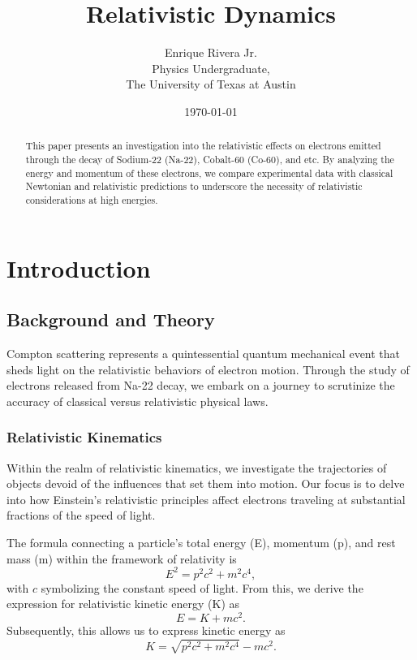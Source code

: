 \documentclass[12pt]{article}
\title{Relativistic Dynamics}
\author{Enrique Rivera Jr. \\
        Physics Undergraduate, \\ 
        The University of Texas at Austin}
\date{\today}
\begin{document}
\maketitle

\begin{abstract}
        This paper presents an investigation into the relativistic effects on electrons emitted through 
        the decay of Sodium-22 (Na-22), Cobalt-60 (Co-60), and etc. By analyzing the energy and momentum of these electrons, 
        we compare experimental data with classical Newtonian and relativistic predictions to underscore 
        the necessity of relativistic considerations at high energies.
\end{abstract}

\section{Introduction}
    \subsection{Background and Theory}
            Compton scattering represents a quintessential quantum mechanical event that sheds light on the relativistic behaviors of electron motion. Through the study of electrons released from Na-22 decay, we embark on a journey to scrutinize the accuracy of classical versus relativistic physical laws.
            
            \subsubsection{Relativistic Kinematics}
                    Within the realm of relativistic kinematics, we investigate the trajectories of objects devoid of the influences that set them into motion. Our focus is to delve into how Einstein's relativistic principles affect electrons traveling at substantial fractions of the speed of light.
                    
                    The formula connecting a particle's total energy (E), momentum (p), and rest mass (m) within the framework of relativity is
                    \begin{equation}
                    E^2 = p^2c^2 + m^2c^4,
                    \end{equation}
                    with \( c \) symbolizing the constant speed of light. From this, we derive the expression for relativistic kinetic energy (K) as
                    \begin{equation}
                    E = K + mc^2.
                    \end{equation}
                    Subsequently, this allows us to express kinetic energy as
                    \begin{equation}
                    K = \sqrt{p^2c^2 + m^2c^4} - mc^2.
                    \end{equation}
\end{document}
